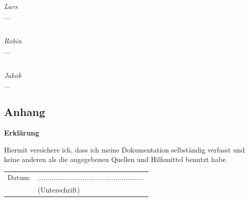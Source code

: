 \documentclass[12pt,a4paper,bibliography=totocnumbered,listof=totocnumbered]{scrartcl}
\begin{document}
\subsection{}
\emph{Lars}\\
...

\subsection{}
\emph{Robin}\\
...

\subsection{}
\emph{Jakob}\\
...

\pagebreak


\renewcommand\refname{Literaturverzeichnis}


\pagebreak


\setcounter{page}{1}

\begin{appendix}

\section*{Anhang}
{}


\end{appendix}


\newpage
\thispagestyle{empty}
\begin{center}
	\vspace*{5em}
	\huge\textbf{Erklärung}\\
\end{center}
\vspace{2em}
Hiermit versichere ich, dass ich meine Dokumentation selbständig verfasst und keine anderen als die angegebenen Quellen und Hilfsmittel benutzt habe.

\vspace{4em}
\begin{minipage}{\linewidth}
	\begin{tabular}{p{15em}p{15em}}
		Datum: &  .......................................................\\
		& \centering (Unterschrift)\\
	\end{tabular}
\end{minipage}
\end{document}
